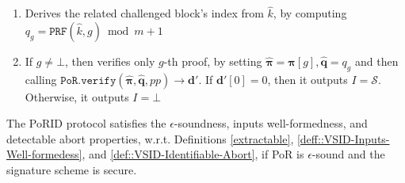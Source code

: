 \begin{enumerate}
\begin{enumerate}
\item Derives the related challenged block's index from $\hat{k}$, by computing $q_{\scriptscriptstyle g}=\mathtt{PRF}(\hat{k},g)\bmod m+1$ 



\item If $g\neq \bot$, then verifies only $g$-th proof, by setting $\hat{\bm{\pi}}={\bm{\pi}}[g], \hat{\bm{q}}=q_{\scriptscriptstyle g}$ and then calling $\mathtt{PoR.verify}( \hat{\bm{\pi}},\hat{\bm{q}},pp)\rightarrow  {\bm{d}}'$. If $ {\bm{d}}'[0]=0$, then it outputs $I=\mathcal S$. Otherwise, it outputs $I=\bot$
\end{enumerate}
\end{enumerate}

\begin{theorem}
The PoRID protocol satisfies the $\epsilon$-soundness, inputs well-formedness, and detectable abort properties, w.r.t. Definitions \ref{extractable}, \ref{deff::VSID-Inputs-Well-formedess}, and \ref{def::VSID-Identifiable-Abort}, if PoR is $\epsilon$-sound and the  signature scheme is secure.
\end{theorem}


